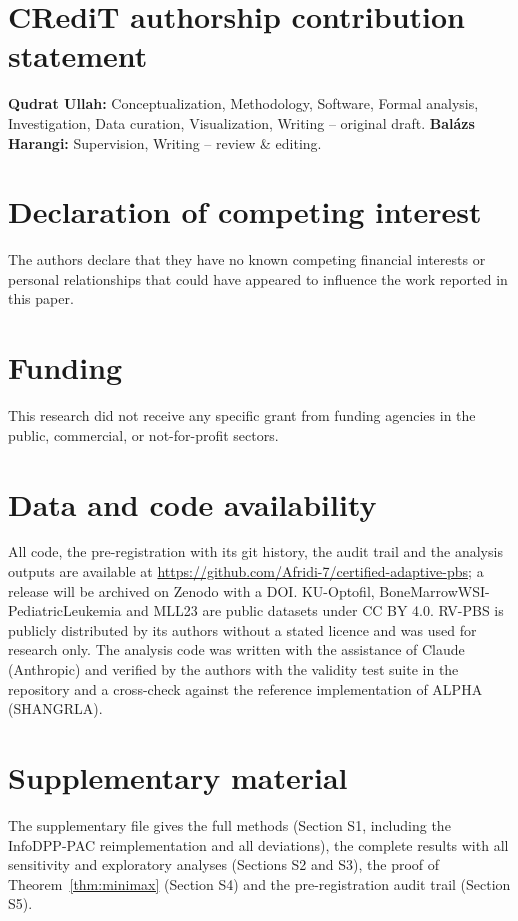 \documentclass[preprint,12pt]{elsarticle}
\theoremstyle{remark}
\theoremstyle{definition}
\begin{document}
\section*{CRediT authorship contribution statement}
\textbf{Qudrat Ullah:} Conceptualization, Methodology, Software, Formal analysis, Investigation, Data curation, Visualization, Writing -- original draft. \textbf{Bal\'azs Harangi:} Supervision, Writing -- review \& editing.

\section*{Declaration of competing interest}
The authors declare that they have no known competing financial interests or personal relationships that could have appeared to influence the work reported in this paper.

\section*{Funding}
This research did not receive any specific grant from funding agencies in the public, commercial, or not-for-profit sectors.

\section*{Data and code availability}
All code, the pre-registration with its git history, the audit trail and the analysis outputs are available at \url{https://github.com/Afridi-7/certified-adaptive-pbs}; a release will be archived on Zenodo with a DOI. KU-Optofil, BoneMarrowWSI-PediatricLeukemia and MLL23 are public datasets under CC BY 4.0. RV-PBS is publicly distributed by its authors without a stated licence and was used for research only. The analysis code was written with the assistance of Claude (Anthropic) and verified by the authors with the validity test suite in the repository and a cross-check against the reference implementation of ALPHA (SHANGRLA).

\section*{Supplementary material}
The supplementary file gives the full methods (Section S1, including the InfoDPP-PAC reimplementation and all deviations), the complete results with all sensitivity and exploratory analyses (Sections S2 and S3), the proof of Theorem~\ref{thm:minimax} (Section S4) and the pre-registration audit trail (Section S5).
\end{document}
